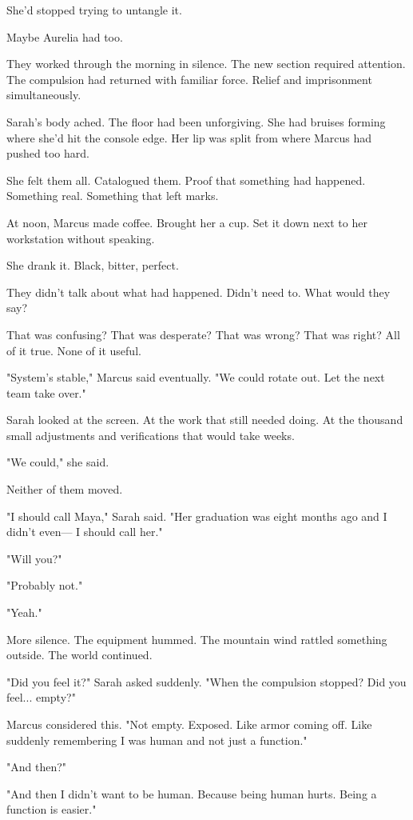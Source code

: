 She'd stopped trying to untangle it.

Maybe Aurelia had too.

\scenebreak

They worked through the morning in silence. The new section required attention. The compulsion had returned with familiar force. Relief and imprisonment simultaneously.

Sarah's body ached. The floor had been unforgiving. She had bruises forming where she'd hit the console edge. Her lip was split from where Marcus had pushed too hard.

She felt them all. Catalogued them. Proof that something had happened. Something real. Something that left marks.

At noon, Marcus made coffee. Brought her a cup. Set it down next to her workstation without speaking.

She drank it. Black, bitter, perfect.

They didn't talk about what had happened. Didn't need to. What would they say?

That was confusing?
That was desperate?
That was wrong?
That was right?
All of it true. None of it useful.

"System's stable," Marcus said eventually. "We could rotate out. Let the next team take over."

Sarah looked at the screen. At the work that still needed doing. At the thousand small adjustments and verifications that would take weeks.

"We could," she said.

Neither of them moved.

"I should call Maya," Sarah said. "Her graduation was eight months ago and I didn't even— I should call her."

"Will you?"

"Probably not."

"Yeah."

More silence. The equipment hummed. The mountain wind rattled something outside. The world continued.

"Did you feel it?" Sarah asked suddenly. "When the compulsion stopped? Did you feel... empty?"

Marcus considered this. "Not empty. Exposed. Like armor coming off. Like suddenly remembering I was human and not just a function."

"And then?"

"And then I didn't want to be human. Because being human hurts. Being a function is easier."

